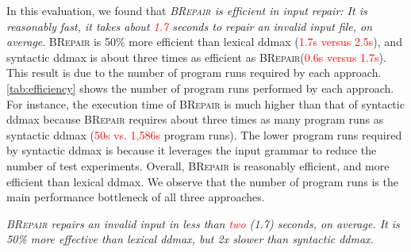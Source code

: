 \documentclass[sigconf,review,anonymous]{acmart}
\newenvironment{result}{\begin{framed}\centering\it}{\end{framed}}
\newcommand{\recheck}[1]{\textcolor{red}{#1}}
\newcommand{\approach}{\textsc{BRepair}\xspace}
\begin{document}
In this evaluation, we found that \textit{\approach is efficient in input repair: It is reasonably fast, it takes about \recheck{1.7} seconds to repair an invalid input file, on average}. 
\approach is 50\% more efficient than lexical ddmax (\recheck{1.7s versus 2.5s}), and syntactic ddmax is about three times as efficient as \approach (\recheck{0.6s versus 1.7s}). 
This result is %
due to the %
number of program runs required by each approach. 
\autoref{tab:efficiency} %
shows %
the number of %
program runs performed by each approach. %
For instance, the execution time 
of \approach %
is much higher %
than that of syntactic ddmax 
because \approach requires about three times as many program runs as syntactic ddmax (\recheck{50s vs. 1,586s} program runs). 
The lower program runs required by syntactic ddmax is because %
it leverages the input grammar to reduce the number of test experiments. 
Overall, %
\approach is reasonably efficient, and %
more efficient than lexical ddmax. %
We observe that the number of program runs is the main performance bottleneck of all three approaches. %

\begin{result}
\approach %
repairs an invalid input in less than \recheck{two} (1.7) seconds, on average. %
It is 50\% more effective than lexical ddmax, but 2x slower than syntactic ddmax. 
\end{result}
\end{document}
